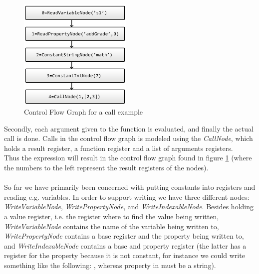 \begin{figure}
	\vspace{-20pt}
	\begin{center}
		\includegraphics[width=0.48\textwidth]{images/Call-example.png}
	\end{center}
	\vspace{-10pt}
	\caption{Control Flow Graph for a call example}
	\label{fig:callCfg}
	\vspace{-10pt}
\end{figure}
Secondly, each argument given to the function is evaluated, and finally the actual call is done. Calls in the control flow graph is modeled using the \textit{CallNode}, which holds a result register, a function register and a list of arguments registers. \\
Thus the expression  will result in the control flow graph found in figure \ref{fig:callCfg} (where the numbers to the left represent the result registers of the nodes).\\
 \\
So far we have primarily been concerned with putting constants into registers and reading e.g. variables. In order to support writing we have three different nodes: \textit{WriteVariableNode}, \textit{WritePropertyNode}, and \textit{WriteIndexableNode}. Besides holding a value register, i.e. the register where to find the value being written, \textit{WriteVariableNode} contains the name of the variable being written to, \textit{WritePropertyNode} contains a base register and the property being written to, and \textit{WriteIndexableNode} contains a base and property register (the latter has a register for the property because it is not constant, for instance we could write something like the following: , whereas property in  must be a string).

